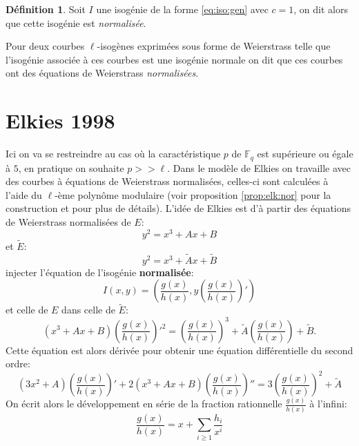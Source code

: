 \documentclass[10pt,a4paper]{book}
\theoremstyle{plain}
\theoremstyle{definition}
\theoremstyle{definition}
\theoremstyle{definition}
\theoremstyle{definition}
\newtheorem{defi}[thm]{Définition}
\theoremstyle{remark}
\theoremstyle{remark}
\begin{document}
\begin{defi}
Soit $I$ une isogénie de la forme \eqref{eq:iso:gen} avec $c=1$, on dit alors que cette isogénie est \emph{normalisée}. 

Pour deux courbes $\ell$-isogènes exprimées sous forme de Weierstrass telle que l'isogénie associée à ces courbes est une isogénie normale on dit que ces courbes ont des équations de Weierstrass \emph{normalisées}. 
\end{defi}
\section{Elkies 1998}
Ici on va se restreindre au cas où la caractéristique $p$ de $\mathbb{F}_q$ est supérieure ou égale à $5$, en pratique on souhaite $p >> \ell$.
Dans le modèle de Elkies on travaille avec des courbes à équations de Weierstrass normalisées, celles-ci sont calculées à l'aide du $\ell$-ème polynôme modulaire (voir proposition \ref{prop:elk:nor} pour la construction et \cite{Schoof95} pour plus de détails).
L'idée de Elkies est d'à partir des équations de Weierstrass normalisées de $E:$
\begin{equation}
y^2=x^3+Ax+B
\end{equation}
 et $\tilde{E}:$
\begin{equation}
y^2=x^3+\tilde{A}x+\tilde{B}
\end{equation}
injecter l'équation de l'isogénie \textbf{normalisée}:
\begin{equation} 
\label{eq:velu:gh}
I(x,y)=\left(\frac{g(x)}{h(x)},y\left( \frac{g(x)}{h(x)} \right)'\right) 
\end{equation}
et celle de $E$ dans celle de $\tilde{E}$:
\begin{equation}
(x^3+Ax+B)\left(\frac{g(x)}{h(x)} \right)'^2=  \left(\frac{g(x)}{h(x)} \right)^3 + \tilde{A} \left(\frac{g(x)}{h(x)} \right) + \tilde{B}.
\end{equation}
Cette équation est alors dérivée pour obtenir une équation différentielle du second ordre:
\begin{equation}
\label{eq:Elkies-deriv}
(3x^2+A)\left(\frac{g(x)}{h(x)} \right)'+2(x^3+Ax+B)\left(\frac{g(x)}{h(x)} \right)''=  3\left(\frac{g(x)}{h(x)} \right)^2 + \tilde{A}
\end{equation}
On écrit alors le développement en série de la fraction rationnelle $\frac{g(x)}{h(x)}$ à l'infini:
\begin{equation}
\label{eq:iso:frac}
\frac{g(x)}{h(x)}=x+ \sum_{i\geqslant 1} \frac{h_i}{x^i}
\end{equation}
\end{document}
